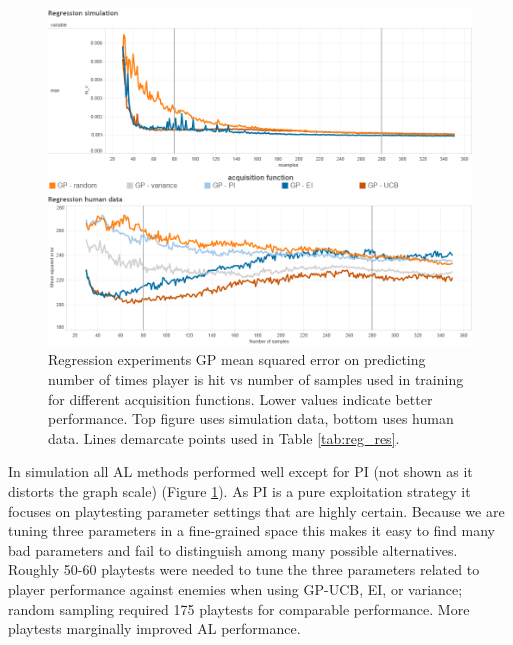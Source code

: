 \documentclass{sig-alternate}
\begin{document}
\begin{figure}[tb]
\centering
\includegraphics[width=\linewidth]{regression_results}
\caption{Regression experiments GP mean squared error on predicting number of times player is hit vs number of samples used in training for different acquisition functions. Lower values indicate better performance. Top figure uses simulation data, bottom uses human data. Lines demarcate points used in Table \ref{tab:reg_res}.}
\label{fig:reg_all}
\end{figure}


In simulation all AL methods performed well except for PI (not shown as it distorts the graph scale) (Figure \ref{fig:reg_all}).
As PI is a pure exploitation strategy it focuses on playtesting parameter settings that are highly certain.
Because we are tuning three parameters in a fine-grained space this makes it easy to find many bad parameters and fail to distinguish among many possible alternatives.
Roughly 50-60 playtests were needed to tune the three parameters related to player performance against enemies when using GP-UCB, EI, or variance; random sampling required 175 playtests for comparable performance.
More playtests marginally improved AL performance.
\end{document}

